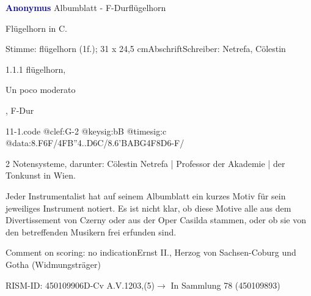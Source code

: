 \documentclass[a4paper, twocolumn, 11pt]{book}
\begin{document}
\par \vspace{16pt} \textcolor{darkblue}{\textbf{Anonymus  }}\hfillplus{[11]}\newline Albumblatt - F-Dur\newline flügelhorn
\par \begin{itshape}[heading:] Flügelhorn in C.\end{itshape} 
\par \textcolor{darkblue}{}  Stimme: flügelhorn  (1f.); 31 x 24,5 cm\newline Abschrift\newline Schreiber: Netrefa, Cölestin
\par 1.1.1  flügelhorn, \begin{itshape}Un poco moderato\end{itshape}, F-Dur  
\begin{filecontents*}{11-1.code}
@clef:G-2
@keysig:bB
@timesig:c
@data:{8.F6F}/4FB''4..D6C/8.6'{BABG}4F8D6-F/
\end{filecontents*}
\newline %
\par 2 Notensysteme, darunter: Cölestin Netrefa | Professor der Akademie | der Tonkunst in Wien.
\par Jeder Instrumentalist hat auf seinem Albumblatt ein kurzes Motiv für sein jeweiliges Instrument notiert. Es ist nicht klar, ob diese Motive alle aus dem {\textquotedbl}Divertissement{\textquotedbl} von Czerny oder aus der Oper {\textquotedbl}Casilda{\textquotedbl} stammen, oder ob sie von den betreffenden Musikern frei erfunden sind.
\par Comment on scoring: no indication\newline Ernst II., Herzog von Sachsen-Coburg und Gotha  (Widmungsträger)
\par RISM-ID: 450109906\newline D-Cv  A.V.1203,(5)\newline $\rightarrow$ In Sammlung 78 (450109893)
      
\end{document}
